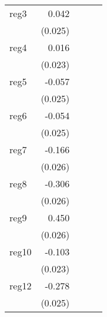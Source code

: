 {\begin{longtable}{l*{4}{D{.}{.}{-1}}}
\addlinespace
reg3        &       0.042         &                     &                     &                     \\
            &     (0.025)         &                     &                     &                     \\
\addlinespace
reg4        &       0.016         &                     &                     &                     \\
            &     (0.023)         &                     &                     &                     \\
\addlinespace
reg5        &      -0.057\sym{*}  &                     &                     &                     \\
            &     (0.025)         &                     &                     &                     \\
\addlinespace
reg6        &      -0.054\sym{*}  &                     &                     &                     \\
            &     (0.025)         &                     &                     &                     \\
\addlinespace
reg7        &      -0.166\sym{***}&                     &                     &                     \\
            &     (0.026)         &                     &                     &                     \\
\addlinespace
reg8        &      -0.306\sym{***}&                     &                     &                     \\
            &     (0.026)         &                     &                     &                     \\
\addlinespace
reg9        &       0.450\sym{***}&                     &                     &                     \\
            &     (0.026)         &                     &                     &                     \\
\addlinespace
reg10       &      -0.103\sym{***}&                     &                     &                     \\
            &     (0.023)         &                     &                     &                     \\
\addlinespace
reg12       &      -0.278\sym{***}&                     &                     &                     \\
            &     (0.025)         &                     &                     &                     \\

\end{longtable}}

